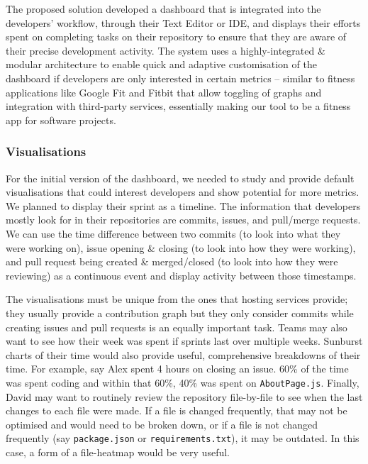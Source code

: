 \documentclass[../mpaper.tex]{subfiles}
\begin{document}
The proposed solution developed a dashboard that is integrated into the developers' workflow, through their Text Editor or IDE, and displays their efforts spent on completing tasks on their repository to ensure that they are aware of their precise development activity. The system uses a highly-integrated \& modular architecture to enable quick and adaptive customisation of the dashboard if developers are only interested in certain metrics -- similar to fitness applications like Google Fit and Fitbit that allow toggling of graphs and integration with third-party services, essentially making our tool to be a fitness app for software projects.

\subsubsection*{Visualisations}

For the initial version of the dashboard, we needed to study and provide default visualisations that could interest developers and show potential for more metrics. We planned to display their sprint as a timeline. The information that developers mostly look for in their repositories are commits, issues, and pull/merge requests. We can use the time difference between two commits (to look into what they were working on), issue opening \& closing (to look into how they were working), and pull request being created \& merged/closed (to look into how they were reviewing) as a continuous event and display activity between those timestamps.

The visualisations must be unique from the ones that hosting services provide; they usually provide a contribution graph but they only consider commits while creating issues and pull requests is an equally important task. Teams may also want to see how their week was spent if sprints last over multiple weeks. Sunburst charts of their time would also provide useful, comprehensive breakdowns of their time. For example, say Alex spent 4 hours on closing an issue. 60\% of the time was spent coding and within that 60\%, 40\% was spent on \texttt{AboutPage.js}. Finally, David may want to routinely review the repository file-by-file to see when the last changes to each file were made. If a file is changed frequently, that may not be optimised and would need to be broken down, or if a file is not changed frequently (say \texttt{package.json} or \texttt{requirements.txt}), it may be outdated. In this case, a form of a file-heatmap would be very useful.
\end{document}
